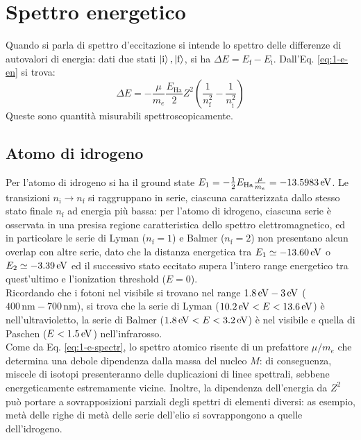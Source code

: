 \section{Spettro energetico}

Quando si parla di spettro d'eccitazione si intende lo spettro delle differenze di autovalori di energia: dati due stati $ \ket{\text{i}} , \ket{\text{f}} $, si ha $ \Delta E = E_\text{f} - E_\text{i} $. Dall'Eq. \ref{eq:1-e-en} si trova:
\begin{equation}
	\Delta E = - \frac{\mu}{m_e} \frac{E_\text{Ha}}{2} Z^2 \left( \frac{1}{n_\text{f}^2} - \frac{1}{n_\text{i}^2} \right)
	\label{eq:1-e-spectr}
\end{equation}
Queste sono quantità misurabili spettroscopicamente.

\subsection{Atomo di idrogeno}

Per l'atomo di idrogeno si ha il ground state $ E_1 = - \frac{1}{2} E_\text{Ha} \frac{\mu}{m_e} = - 13.5983\,\mathrm{eV} $. Le transizioni $ n_\text{i} \rightarrow n_\text{f} $ si raggruppano in serie, ciascuna caratterizzata dallo stesso stato finale $ n_\text{f} $ ad energia più bassa: per l'atomo di idrogeno, ciascuna serie è osservata in una presisa regione caratteristica dello spettro elettromagnetico, ed in particolare le serie di Lyman ($ n_\text{f} = 1 $) e Balmer ($ n_\text{f} = 2 $) non presentano alcun overlap con altre serie, dato che la distanza energetica tra $ E_1 \simeq - 13.60\,\mathrm{eV} $ o $ E_2 \simeq -3.39\,\mathrm{eV} $ ed il successivo stato eccitato supera l'intero range energetico tra quest'ultimo e l'ionization threshold ($ E = 0 $).\\
Ricordando che i fotoni nel visibile si trovano nel range $ 1.8\,\mathrm{eV} - 3\,\mathrm{eV} $ ($ 400\,\text{nm} - 700\,\text{nm} $), si trova che la serie di Lyman ($ 10.2\,\mathrm{eV} < E < 13.6\,\mathrm{eV} $) è nell'ultravioletto, la serie di Balmer ($ 1.8\,\mathrm{eV} < E < 3.2\,\mathrm{eV} $) è nel visibile e quella di Paschen ($ E < 1.5\,\mathrm{eV} $) nell'infrarosso.\\
Come da Eq. \ref{eq:1-e-spectr}, lo spettro atomico risente di un prefattore $ \mu / m_e $ che determina una debole dipendenza dalla massa del nucleo $ M $: di conseguenza, miscele di isotopi presenteranno delle duplicazioni di linee spettrali, sebbene energeticamente estremamente vicine. Inoltre, la dipendenza dell'energia da $ Z^2 $ può portare a sovrapposizioni parziali degli spettri di elementi diversi: as esempio, metà delle righe di metà delle serie dell'elio si sovrappongono a quelle dell'idrogeno.

